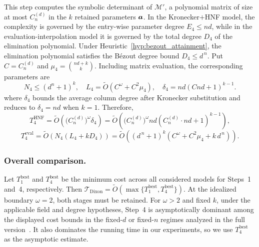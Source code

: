 This step computes the symbolic determinant of $\mathcal{M}'$, a polynomial matrix of size at most $C_n^{(d)}$ in the $k$ retained parameters ${\boldsymbol{a}}$. In the Kronecker$+$HNF model, the complexity is governed by the entry-wise parameter degree $E_4\le nd$, while in the evaluation-interpolation model it is governed by the total degree $D_4$ of the elimination polynomial.
Under Heuristic~\ref{hyp:bezout_attainment}, the elimination polynomial satisfies the B\'ezout degree bound
$
D_4 \le d^{\,n}.
$
Put $C=C_n^{(d)}$ and $\mu_4=\binom{nd+k}{k}$. Including matrix evaluation, the corresponding parameters are
\begin{equation}
 N_4\le(d^n+1)^k,\quad
 L_4=\widetilde O(C^\omega+C^2\mu_4),\quad
 \delta_4=nd(Cnd+1)^{k-1}.
 \label{eq:step4_params}
\end{equation}
where $\delta_4$ bounds the average column degree after Kronecker substitution and reduces to $\delta_4=nd$ when $k=1$. Therefore,
\begin{equation}
	T_{4}^{\mathrm{HNF}}
	=
	\widetilde{O}\!\left(\bigl(C_n^{(d)}\bigr)^\omega\delta_4\right)
	=
	\widetilde{O}\!\left(\bigl(C_n^{(d)}\bigr)^\omega nd(C_n^{(d)}\cdot nd+1)^{k-1}\right),
	\label{eq:step4_hnf}
\end{equation}
\begin{equation}
	T_{4}^{\mathrm{eval}}
	=
	\widetilde{O}\!\left(N_4(L_4+kD_4)\right)
	=
	\widetilde{O}\!\left((d^{\,n}+1)^k\left(C^\omega+C^2\mu_4+k\,d^{\,n}\right)\right).
	\label{eq:step4_eval}
\end{equation}

\subsubsection{Overall comparison.}
Let $T_{1}^{\mathrm{best}}$ and $T_{4}^{\mathrm{best}}$ be the minimum cost across all considered models for Steps~1 and~4, respectively. Then
$\mathcal{T}_{\mathrm{Dixon}} = \widetilde{O}(\max\{T_{1}^{\mathrm{best}},T_{4}^{\mathrm{best}}\}).$
At the idealized boundary $\omega=2$, both stages must be retained. For $\omega>2$ and fixed $k$, under the applicable field and degree hypotheses, Step~4 is asymptotically dominant among the displayed cost bounds in the fixed-$d$ or fixed-$n$ regimes analyzed in the full version~\cite{cryptoeprint:2026/1969}. It also dominates the running time in our experiments, so we use $T_{4}^{\mathrm{best}}$ as the asymptotic estimate.

